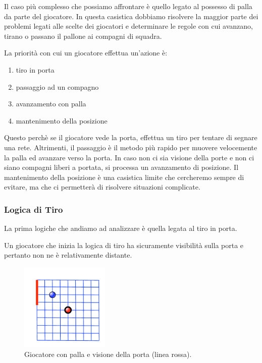 \documentclass[aps,letterpaper,10pt]{article}
\begin{document}
Il caso pi\`u complesso che possiamo affrontare \`e quello legato al possesso di palla da parte del giocatore. In questa
casistica dobbiamo risolvere la maggior parte dei problemi legati alle scelte dei giocatori e determinare le regole con
cui avanzano, tirano o passano il pallone ai compagni di squadra. \vspace{3mm}

La priorit\`a con cui un giocatore effettua un'azione \`e:

\begin{enumerate}
	\item tiro in porta
	\item passaggio ad un compagno
	\item avanzamento con palla
	\item mantenimento della posizione
\end{enumerate}

Questo perch\`e se il giocatore vede la porta, effettua un tiro per tentare di segnare una rete. Altrimenti, il
passaggio \`e il metodo pi\`u rapido per muovere velocemente la palla ed avanzare verso la porta. In caso non ci sia
visione della porte e non ci siano compagni liberi a portata, si processa un avanzamento di posizione. Il mantenimento
della posizione \`e una casistica limite che cercheremo sempre di evitare, ma che ci permetter\`a di risolvere
situazioni complicate.

\subsubsection{Logica di Tiro}
\label{tiro}

La prima logiche che andiamo ad analizzare \`e quella legata al tiro in porta. \vspace{3mm}

Un giocatore che inizia la logica di tiro ha sicuramente visibilit\`a sulla porta e pertanto non ne \`e relativamente
distante.

\begin{figure}[H]
	\begin{center}
		\includegraphics[width=160px]{images/vision1.pdf}
	\end{center}
\caption{Giocatore con palla e visione della porta (linea rossa).}
\end{figure}
\end{document}
